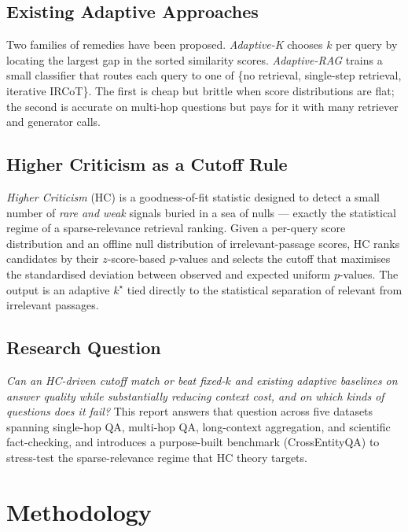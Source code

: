 \documentclass[letterpaper]{article}
\begin{document}
\subsection{Existing Adaptive Approaches}
Two families of remedies have been proposed. \emph{Adaptive-K}
\cite{adaptivek2025} chooses $k$ per query by locating the largest gap
in the sorted similarity scores. \emph{Adaptive-RAG}
\cite{jeong2024adaptiverag} trains a small classifier that routes each
query to one of \{no retrieval, single-step retrieval, iterative
IRCoT\}. The first is cheap but brittle when score distributions are
flat; the second is accurate on multi-hop questions but pays for it
with many retriever and generator calls.

\subsection{Higher Criticism as a Cutoff Rule}
\emph{Higher Criticism} (HC) \cite{donohojin2004hc} is a
goodness-of-fit statistic designed to detect a small number of
\emph{rare and weak} signals buried in a sea of nulls --- exactly the
statistical regime of a sparse-relevance retrieval ranking. Given a
per-query score distribution and an offline null
distribution of irrelevant-passage scores, HC ranks candidates by
their $z$-score-based $p$-values and selects the cutoff that maximises
the standardised deviation between observed and expected uniform
$p$-values. The output is an adaptive $k^\star$ tied directly to the
statistical separation of relevant from irrelevant passages.

\subsection{Research Question}
\emph{Can an HC-driven cutoff match or beat fixed-$k$ and existing
adaptive baselines on answer quality while substantially reducing
context cost, and on which kinds of questions does it fail?}
This report answers that question across five datasets spanning
single-hop QA, multi-hop QA, long-context aggregation, and scientific
fact-checking, and introduces a purpose-built benchmark
(CrossEntityQA) to stress-test the sparse-relevance regime that HC
theory targets.

\section{Methodology}
\end{document}
